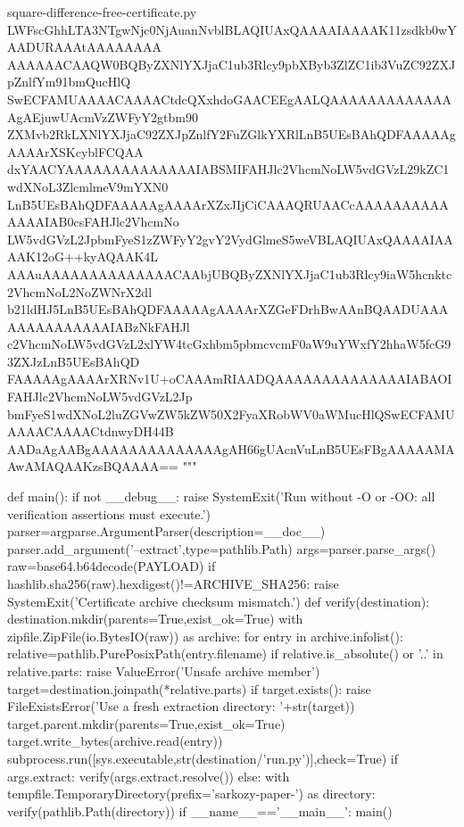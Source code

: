 \documentclass[11pt]{article}
\theoremstyle{definition}
\theoremstyle{remark}
\begin{document}
\begin{filecontents*}[overwrite]{square-difference-free-certificate.py}
LWFscGhhLTA3NTgwNjc0NjAuanNvblBLAQIUAxQAAAAIAAAAK11zsdkb0wYAADURAAAtAAAAAAAA
AAAAAACAAQW0BQByZXNlYXJjaC1ub3Rlcy9pbXByb3ZlZC1ib3VuZC92ZXJpZnlfYm91bmQucHlQ
SwECFAMUAAAACAAAACtdcQXxhdoGAACEEgAALQAAAAAAAAAAAAAAgAEjuwUAcmVzZWFyY2gtbm90
ZXMvb2RkLXNlYXJjaC92ZXJpZnlfY2FuZGlkYXRlLnB5UEsBAhQDFAAAAAgAAAArXSKcyblFCQAA
dxYAACYAAAAAAAAAAAAAAIABSMIFAHJlc2VhcmNoLW5vdGVzL29kZC1wdXNoL3ZlcmlmeV9mYXN0
LnB5UEsBAhQDFAAAAAgAAAArXZxJIjCiCAAAQRUAACcAAAAAAAAAAAAAAIAB0csFAHJlc2VhcmNo
LW5vdGVzL2JpbmFyeS1zZWFyY2gvY2VydGlmeS5weVBLAQIUAxQAAAAIAAAAK12oG++kyAQAAK4L
AAAuAAAAAAAAAAAAAACAAbjUBQByZXNlYXJjaC1ub3Rlcy9iaW5hcnktc2VhcmNoL2NoZWNrX2dl
b21ldHJ5LnB5UEsBAhQDFAAAAAgAAAArXZGeFDrhBwAAnBQAADUAAAAAAAAAAAAAAIABzNkFAHJl
c2VhcmNoLW5vdGVzL2xlYW4tcGxhbm5pbmcvcmF0aW9uYWxfY2hhaW5fcG93ZXJzLnB5UEsBAhQD
FAAAAAgAAAArXRNv1U+oCAAAmRIAADQAAAAAAAAAAAAAAIABAOIFAHJlc2VhcmNoLW5vdGVzL2Jp
bmFyeS1wdXNoL2luZGVwZW5kZW50X2FyaXRobWV0aWMucHlQSwECFAMUAAAACAAAACtdnwyDH44B
AADaAgAABgAAAAAAAAAAAAAAgAH66gUAcnVuLnB5UEsFBgAAAAAMAAwAMAQAAKzsBQAAAA==
"""

def main():
    if not __debug__:
        raise SystemExit('Run without -O or -OO: all verification assertions must execute.')
    parser=argparse.ArgumentParser(description=__doc__)
    parser.add_argument('--extract',type=pathlib.Path)
    args=parser.parse_args()
    raw=base64.b64decode(PAYLOAD)
    if hashlib.sha256(raw).hexdigest()!=ARCHIVE_SHA256:
        raise SystemExit('Certificate archive checksum mismatch.')
    def verify(destination):
        destination.mkdir(parents=True,exist_ok=True)
        with zipfile.ZipFile(io.BytesIO(raw)) as archive:
            for entry in archive.infolist():
                relative=pathlib.PurePosixPath(entry.filename)
                if relative.is_absolute() or '..' in relative.parts:
                    raise ValueError('Unsafe archive member')
                target=destination.joinpath(*relative.parts)
                if target.exists():
                    raise FileExistsError('Use a fresh extraction directory: '+str(target))
                target.parent.mkdir(parents=True,exist_ok=True)
                target.write_bytes(archive.read(entry))
        subprocess.run([sys.executable,str(destination/'run.py')],check=True)
    if args.extract:
        verify(args.extract.resolve())
    else:
        with tempfile.TemporaryDirectory(prefix='sarkozy-paper-') as directory:
            verify(pathlib.Path(directory))
if __name__=='__main__':
    main()
\end{filecontents*}
\end{document}
